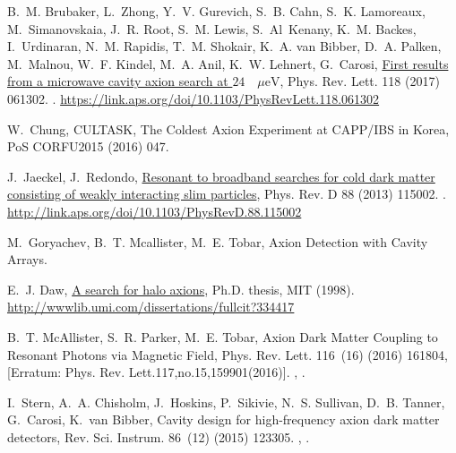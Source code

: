 \documentclass[preprint]{elsarticle}
\begin{document}
\begin{thebibliography}{10}
B.~M. Brubaker, L.~Zhong, Y.~V. Gurevich, S.~B. Cahn, S.~K. Lamoreaux,
  M.~Simanovskaia, J.~R. Root, S.~M. Lewis, S.~Al~Kenany, K.~M. Backes,
  I.~Urdinaran, N.~M. Rapidis, T.~M. Shokair, K.~A. van Bibber, D.~A. Palken,
  M.~Malnou, W.~F. Kindel, M.~A. Anil, K.~W. Lehnert, G.~Carosi,
  \href{https://link.aps.org/doi/10.1103/PhysRevLett.118.061302}{First results
  from a microwave cavity axion search at $24\text{ }\text{
  }\ensuremath{\mu}\mathrm{eV}$}, Phys. Rev. Lett. 118 (2017) 061302.
\newblock \href {http://dx.doi.org/10.1103/PhysRevLett.118.061302}
  {}.
\newline\urlprefix\url{https://link.aps.org/doi/10.1103/PhysRevLett.118.061302}

W.~Chung, {CULTASK, The Coldest Axion Experiment at CAPP/IBS in Korea}, PoS
  CORFU2015 (2016) 047.

J.~Jaeckel, J.~Redondo,
  \href{http://link.aps.org/doi/10.1103/PhysRevD.88.115002}{Resonant to
  broadband searches for cold dark matter consisting of weakly interacting slim
  particles}, Phys. Rev. D 88 (2013) 115002.
\newblock \href {http://dx.doi.org/10.1103/PhysRevD.88.115002}
  {}.
\newline\urlprefix\url{http://link.aps.org/doi/10.1103/PhysRevD.88.115002}

M.~Goryachev, B.~T. Mcallister, M.~E. Tobar, {Axion Detection with Cavity
  Arrays}\href {http://arxiv.org/abs/1703.07207} {}.

E.~J. Daw, \href{http://wwwlib.umi.com/dissertations/fullcit?334417}{{A search
  for halo axions}}, Ph.D. thesis, MIT (1998).
\newline\urlprefix\url{http://wwwlib.umi.com/dissertations/fullcit?334417}

B.~T. McAllister, S.~R. Parker, M.~E. Tobar, {Axion Dark Matter Coupling to
  Resonant Photons via Magnetic Field}, Phys. Rev. Lett. 116~(16) (2016)
  161804, [Erratum: Phys. Rev. Lett.117,no.15,159901(2016)].
\newblock \href {http://arxiv.org/abs/1607.01928} {},
  \href {http://dx.doi.org/10.1103/PhysRevLett.117.159901,
  10.1103/PhysRevLett.116.161804} {}.

I.~Stern, A.~A. Chisholm, J.~Hoskins, P.~Sikivie, N.~S. Sullivan, D.~B. Tanner,
  G.~Carosi, K.~van Bibber, {Cavity design for high-frequency axion dark matter
  detectors}, Rev. Sci. Instrum. 86~(12) (2015) 123305.
\newblock \href {http://arxiv.org/abs/1603.06990} {},
  \href {http://dx.doi.org/10.1063/1.4938164} {}.


\end{thebibliography}
\end{document}
